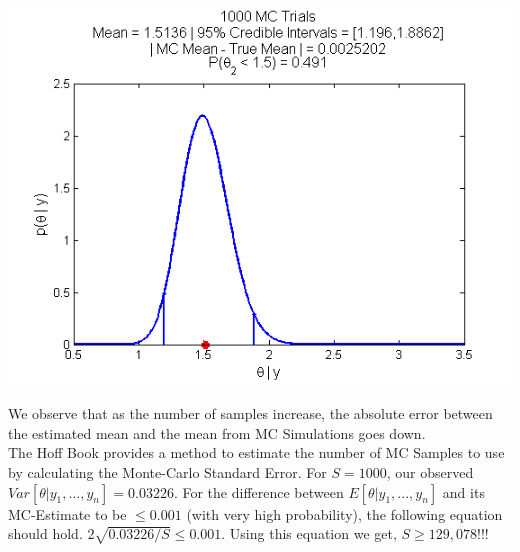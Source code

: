 \documentclass{article}
\begin{document}
\\
\begin{center}
\includegraphics[scale=0.75]{MCTrials_1000.png}
\end{center}

\noindent We observe that as the number of samples increase, the absolute error between the estimated mean and the mean from MC Simulations goes down.\\

\noindent The Hoff Book provides a method to estimate the number of MC Samples to use by calculating the Monte-Carlo Standard Error. For $S = 1000$, our observed $Var[\theta|y_1,...,y_n] = 0.03226.$ 
For the difference between $E[\theta|y_1,...,y_n]$ and its MC-Estimate to be $\le0.001$ (with very high probability), the following equation should hold. $2\sqrt{0.03226/S} \le 0.001.$ Using this equation we get, $S \ge 129,078 !!!$\\

\pagebreak
{}\\

\end{document}
